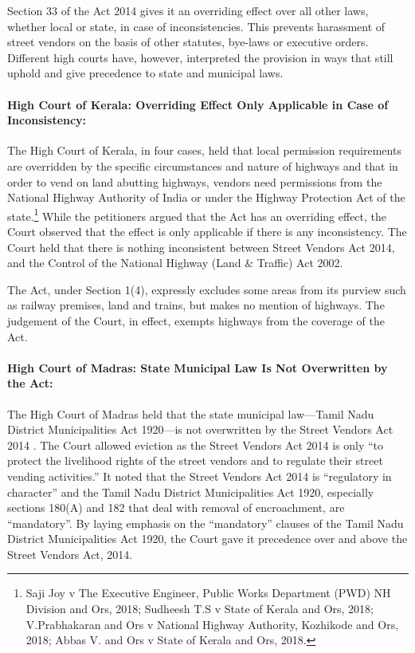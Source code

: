 \documentclass[a4paper, 12pt, twoside]{article}
\begin{document}
{Section 33 of the Act 2014 gives it an overriding effect over all other laws, whether local or state, in case of inconsistencies. This prevents harassment of street vendors on the basis of other statutes, bye-laws or executive orders. Different high courts have, however, interpreted the provision in ways that still uphold and give precedence to state and municipal laws.

\paragraph*{High Court of Kerala: Overriding Effect Only Applicable in Case of Inconsistency:}

The High Court of Kerala, in four cases, held that local permission requirements are overridden by the specific circumstances and nature of highways and that in order to vend on land abutting highways, vendors need permissions from the National Highway Authority of India or under the Highway Protection Act of the state.\footnote{Saji Joy v The Executive Engineer, Public Works Department (PWD) NH Division and Ors, 2018; Sudheesh T.S v State of Kerala and Ors, 2018; V.Prabhakaran and Ors v National Highway Authority, Kozhikode and Ors, 2018; Abbas V. and Ors v State of Kerala and Ors, 2018.} While the petitioners argued that the Act has an overriding effect, the Court observed that the effect is only applicable if there is any inconsistency. The Court held that there is nothing inconsistent between Street Vendors Act 2014, and the Control of the National Highway (Land \& Traffic) Act 2002. 

The Act, under Section 1(4), expressly excludes some areas from its purview such as railway premises, land and trains, but makes no mention of highways. The judgement of the Court, in effect, exempts highways from the coverage of the Act. 

\paragraph*{High Court of Madras: State Municipal Law Is Not Overwritten by the Act:}

The High Court of Madras held that the state municipal law—Tamil Nadu District Municipalities Act 1920—is not overwritten by the Street Vendors Act 2014 \parencite{TRamalingam}. The Court allowed eviction as the Street Vendors Act 2014 is only “to protect the livelihood rights of the street vendors and to regulate their street vending activities.” It noted that the Street Vendors Act 2014 is “regulatory in character” and the Tamil Nadu District Municipalities Act 1920, especially sections 180(A) and 182 that deal with removal of encroachment, are “mandatory”. By laying emphasis on the “mandatory” clauses of the Tamil Nadu District Municipalities Act 1920, the Court gave it precedence over and above the Street Vendors Act, 2014.




}
\end{document}
